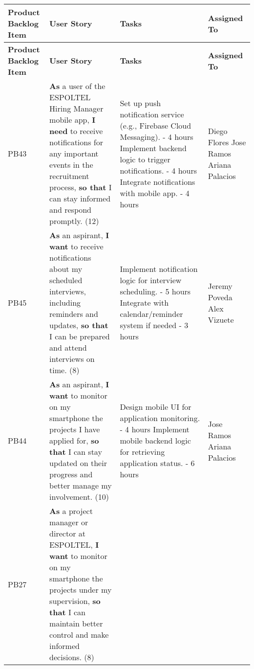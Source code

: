 \documentclass{scrreprt}
\begin{document}
\begin{longtable}{|p{1.5cm}|p{5.5cm}|p{4.5cm}|p{3cm}|} \hline
	\textbf{Product Backlog Item} & \textbf{User Story} & \textbf{Tasks} & \textbf{Assigned To} \\ \hline
	\endfirsthead
	\hline
	\textbf{Product Backlog Item} & \textbf{User Story} & \textbf{Tasks} & \textbf{Assigned To} \\ \hline
	\endhead
	
	PB43 & \textbf{As} a user of the ESPOLTEL Hiring Manager mobile app, \textbf{I need} to receive notifications for any important events in the recruitment process, \textbf{so that} I can stay informed and respond promptly. (12) &
	
	Set up push notification service (e.g., Firebase Cloud Messaging). - 4 hours \newline
	Implement backend logic to trigger notifications. - 4 hours \newline
	Integrate notifications with mobile app. - 4 hours &
	Diego Flores \newline
	Jose Ramos \newline
	Ariana Palacios \\ \hline
	
	PB45 & \textbf{As} an aspirant, \textbf{I want} to receive notifications about my scheduled interviews, including reminders and updates, \textbf{so that} I can be prepared and attend interviews on time. (8) &
	
	Implement notification logic for interview scheduling. - 5 hours
	Integrate with calendar/reminder system if needed - 3 hours &
	Jeremy Poveda \newline
	Alex Vizuete \\ \hline
	
	PB44 & \textbf{As} an aspirant, \textbf{I want} to monitor on my smartphone the projects I have applied for, \textbf{so that} I can stay updated on their progress and better manage my involvement. (10) &
	
	Design mobile UI for application monitoring. - 4 hours \newline
	Implement mobile backend logic for retrieving application status. - 6 hours &
	Jose Ramos \newline
	Ariana Palacios \\ \hline
	
	PB27 & \textbf{As} a project manager or director at ESPOLTEL, \textbf{I want} to monitor on my smartphone the projects under my supervision, \textbf{so that} I can maintain better control and make informed decisions. (8) &
	

\end{longtable}
\end{document}
